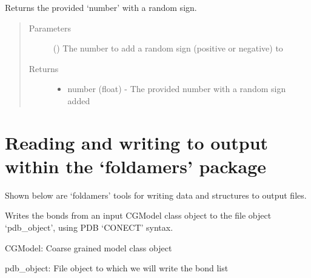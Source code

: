 \documentclass[letterpaper,12pt,english,openany,oneside]{sphinxmanual}
\begin{document}

\begin{fulllineitems}
\label{\detokenize{utilities:utilities.util.random_sign}}
Returns the provided ‘number’ with a random sign.
\begin{quote}\begin{description}
\item[{Parameters}] \leavevmode
{} () \textendash{} The number to add a random sign (positive or negative) to

\item[{Returns}] \leavevmode
\begin{itemize}
\item {} 
number (float) - The provided number with a random sign added

\end{itemize}


\end{description}\end{quote}

\end{fulllineitems}


\newpage


\section{Reading and writing to output within the ‘foldamers’ package}
\label{\detokenize{utilities:reading-and-writing-to-output-within-the-foldamers-package}}
Shown below are ‘foldamers’ tools for writing data and structures to output files.

\label{\detokenize{utilities:module-utilities.iotools}}

\begin{fulllineitems}
\label{\detokenize{utilities:utilities.iotools.write_bonds}}
Writes the bonds from an input CGModel class object to the file object ‘pdb\_object’, using PDB ‘CONECT’ syntax.

CGModel: Coarse grained model class object

pdb\_object: File object to which we will write the bond list

\end{fulllineitems}
\end{document}
